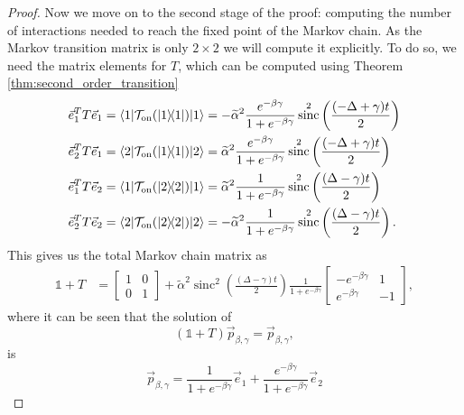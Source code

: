 \documentclass[
 amsmath,amssymb,
 aps,
onecolumn, 
nofootinbib]{revtex4-2}
\newcommand{\on}{\rm on}
\newcommand{\ket}[1]{|#1\rangle}
\newcommand{\bra}[1]{\langle #1|}
\newcommand{\ketbra}[2]{| #1\rangle\! \langle #2|}
\newcommand{\identity}{\mathds{1}}
\DeclareMathOperator{\sinc}{sinc}
\begin{document}
\begin{proof}
 Now we move on to the second stage of the proof: computing the number of interactions needed to reach the fixed point of the Markov chain. As the Markov transition matrix is only $2 \times 2$ we will compute it explicitly. To do so, we need the matrix elements for $T$, which can be computed using Theorem \ref{thm:second_order_transition} 
\begin{align}
        \vec{e}_1^T T \vec{e}_1 = \bra{1} \mathcal{T}_{\on}(\ketbra{1}{1}) \ket{1} &= - \widetilde{\alpha}^2 \frac{e^{-\beta \gamma}}{1 + e^{-\beta \gamma}} \sinc^2 \left( \frac{(-\Delta + \gamma)t}{2}\right) \label{eq:single_qubit_markov_1}\\
        \vec{e}_2^T T \vec{e}_1 = \bra{2} \mathcal{T}_{\on}(\ketbra{1}{1}) \ket{2} &=  \widetilde{\alpha}^2 \frac{e^{-\beta \gamma}}{1 + e^{-\beta \gamma}} \sinc^2 \left( \frac{(-\Delta + \gamma)t}{2}\right) \\
        \vec{e}_1^T T \vec{e}_2 = \bra{1} \mathcal{T}_{\on}(\ketbra{2}{2}) \ket{1} &=  \widetilde{\alpha}^2 \frac{1}{1 + e^{-\beta \gamma}} \sinc^2 \left( \frac{(\Delta - \gamma)t}{2}\right)\\
        \vec{e}_2^T T \vec{e}_2 = \bra{2} \mathcal{T}_{\on}(\ketbra{2}{2}) \ket{2} &= - \widetilde{\alpha}^2 \frac{1}{1 + e^{-\beta \gamma}} \sinc^2 \left( \frac{(\Delta - \gamma)t}{2}\right). \label{eq:single_qubit_markov_4}
    \end{align}
This gives us the total Markov chain matrix as 
\begin{align}
    \identity + T &= \begin{bmatrix} 1 & 0 \\ 0 & 1 \end{bmatrix} + \widetilde{\alpha}^2 \sinc^2 \left(\frac{(\Delta - \gamma)t}{2} \right) \frac{1}{1 + e^{-\beta \gamma}}\begin{bmatrix} -e^{-\beta \gamma} & 1 \\ e^{-\beta \gamma} & -1\end{bmatrix},\label{eq:markov_matrix_single_qubit_gamma}
\end{align}
 where it can be seen that
 the solution of
 \begin{equation}
     (\identity +T)\vec{p}_{\beta,\gamma} = \vec{p}_{\beta,\gamma},
 \end{equation}
 is
 \begin{equation}
     \vec{p}_{\beta, \gamma} = \frac{1}{1 + e^{-\beta \gamma}} \vec{e}_1 + \frac{e^{-\beta \gamma}}{1 + e^{-\beta \gamma}} \vec{e}_2
 \end{equation}

\end{proof}
\end{document}
